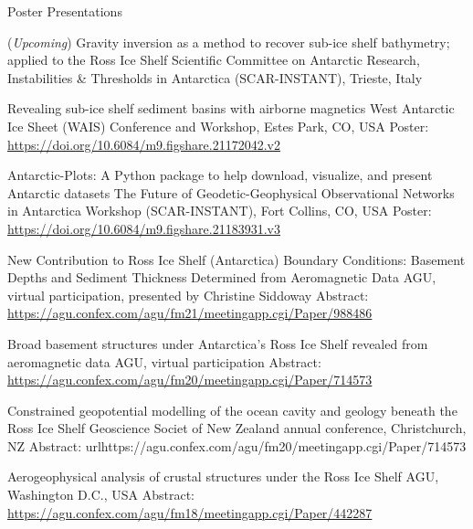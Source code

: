 \documentclass{ExpressiveResume}
\begin{document}
\noindent Poster Presentations \newline

\begin{cventries}

    {(\textit{Upcoming}) Gravity inversion as a method to recover sub-ice shelf bathymetry; applied to the Ross Ice Shelf}
    {Scientific Committee on Antarctic Research, Instabilities \&
        Thresholds in Antarctica (SCAR-INSTANT), Trieste, Italy}
    {}
    {}




    {Revealing sub-ice shelf sediment basins with airborne magnetics}
    {West Antarctic Ice Sheet (WAIS) Conference and Workshop, Estes Park, CO, USA}
    {Poster: \url{https://doi.org/10.6084/m9.figshare.21172042.v2}}
    {}
    {}

    {Antarctic-Plots: A Python package to help download, visualize, and present Antarctic datasets}
    {The Future of Geodetic-Geophysical Observational Networks in
        Antarctica Workshop (SCAR-INSTANT), Fort Collins, CO, USA}
    {Poster: \url{https://doi.org/10.6084/m9.figshare.21183931.v3}}
    {}
    {}

    {New Contribution to Ross Ice Shelf (Antarctica) Boundary Conditions: Basement Depths and Sediment Thickness Determined from Aeromagnetic Data}
    {AGU, virtual participation, presented by Christine Siddoway}
    {Abstract: \url{https://agu.confex.com/agu/fm21/meetingapp.cgi/Paper/988486}}
    {}
    {}

    {Broad basement structures under Antarctica’s Ross Ice Shelf revealed from aeromagnetic data}
    {AGU, virtual participation}
    {Abstract: \url{https://agu.confex.com/agu/fm20/meetingapp.cgi/Paper/714573}}
    {}
    {}

    {Constrained geopotential modelling of the ocean cavity and geology beneath the Ross Ice Shelf}
    {Geoscience Societ of New Zealand annual conference, Christchurch, NZ}
    {Abstract: url{https://agu.confex.com/agu/fm20/meetingapp.cgi/Paper/714573}}
    {}
    {}

    {Aerogeophysical analysis of crustal structures under the Ross Ice Shelf}
    {AGU, Washington D.C., USA}
    {Abstract: \url{https://agu.confex.com/agu/fm18/meetingapp.cgi/Paper/442287}}
    {}
    {}

\end{cventries}
\end{document}
